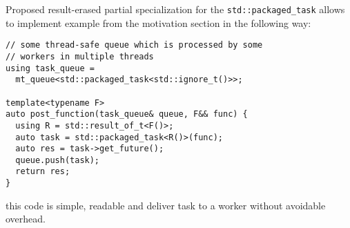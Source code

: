 \documentclass[ebook,openany,10pt,oneside,final]{memoir}
\begin{document}
Proposed result-erased partial specialization for the \mbox{\texttt{std::packaged_task}}
allows to implement example from the motivation section in the following way:

\begin{lstlisting}
// some thread-safe queue which is processed by some
// workers in multiple threads
using task_queue =
  mt_queue<std::packaged_task<std::ignore_t()>>;

template<typename F>
auto post_function(task_queue& queue, F&& func) {
  using R = std::result_of_t<F()>;
  auto task = std::packaged_task<R()>(func);
  auto res = task->get_future();
  queue.push(task);
  return res;
}
\end{lstlisting}
this code is simple, readable and deliver task to a worker without avoidable
overhead.
\end{document}
